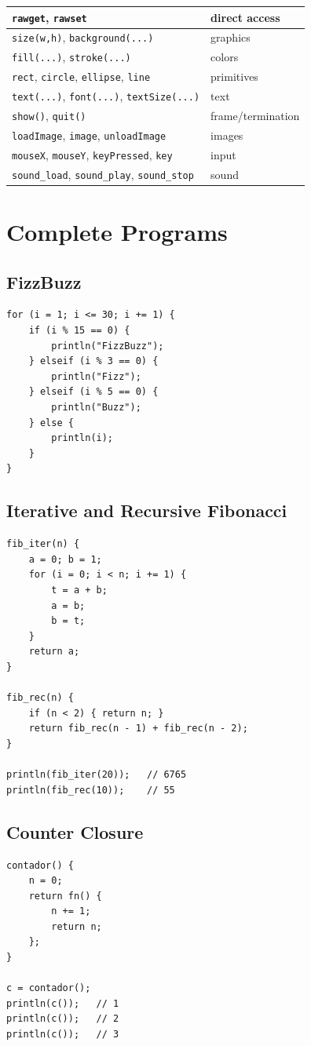 \documentclass[11pt,a4paper,oneside]{report}
\newcommand{\code}[1]{\texttt{#1}}
\begin{document}
\begin{longtable}{@{}L{4.8cm}L{10.5cm}@{}}
\code{rawget}, \code{rawset} & direct access \\
\midrule
\code{size(w,h)}, \code{background(...)} & graphics \\
\code{fill(...)}, \code{stroke(...)} & colors \\
\code{rect}, \code{circle}, \code{ellipse}, \code{line} & primitives \\
\code{text(...)}, \code{font(...)}, \code{textSize(...)} & text \\
\code{show()}, \code{quit()} & frame/termination \\
\code{loadImage}, \code{image}, \code{unloadImage} & images \\
\code{mouseX}, \code{mouseY}, \code{keyPressed}, \code{key} & input \\
\code{sound\_load}, \code{sound\_play}, \code{sound\_stop} & sound \\
\bottomrule
\end{longtable}

\chapter{Complete Programs}
\label{ap:exemplos}

\section{FizzBuzz}
\begin{lstlisting}
for (i = 1; i <= 30; i += 1) {
    if (i % 15 == 0) {
        println("FizzBuzz");
    } elseif (i % 3 == 0) {
        println("Fizz");
    } elseif (i % 5 == 0) {
        println("Buzz");
    } else {
        println(i);
    }
}
\end{lstlisting}

\section{Iterative and Recursive Fibonacci}
\begin{lstlisting}
fib_iter(n) {
    a = 0; b = 1;
    for (i = 0; i < n; i += 1) {
        t = a + b;
        a = b;
        b = t;
    }
    return a;
}

fib_rec(n) {
    if (n < 2) { return n; }
    return fib_rec(n - 1) + fib_rec(n - 2);
}

println(fib_iter(20));   // 6765
println(fib_rec(10));    // 55
\end{lstlisting}

\section{Counter Closure}
\begin{lstlisting}
contador() {
    n = 0;
    return fn() {
        n += 1;
        return n;
    };
}

c = contador();
println(c());   // 1
println(c());   // 2
println(c());   // 3
\end{lstlisting}
\end{document}
